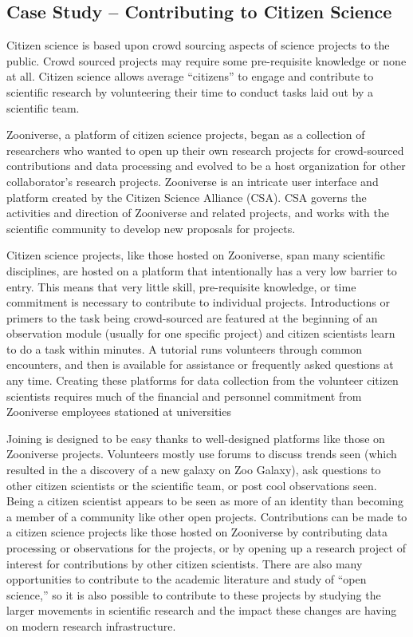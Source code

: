 \subsection{Case Study -- Contributing to Citizen Science}

Citizen science is based upon crowd sourcing aspects of science projects to the public. Crowd sourced projects may require some pre-requisite knowledge or none at all. Citizen science allows average “citizens” to engage and contribute to scientific research by volunteering their time to conduct tasks laid out by a scientific team. 
 
Zooniverse, a platform of citizen science projects, began as a collection of researchers who wanted to open up their own research projects for crowd-sourced contributions and data processing and evolved to be a host organization for other collaborator’s research projects. Zooniverse is an intricate user interface and platform created by the Citizen Science Alliance (CSA). CSA governs the activities and direction of Zooniverse and related projects, and works with the scientific community to develop new proposals for projects. 
 
Citizen science projects, like those hosted on Zooniverse, span many scientific disciplines, are hosted on a platform that intentionally has a very low barrier to entry. This means that very little skill, pre-requisite knowledge, or time commitment is necessary to contribute to individual projects. Introductions or primers to the task being crowd-sourced are featured at the beginning of an observation module (usually for one specific project) and citizen scientists learn to do a task within minutes. A tutorial runs volunteers through common encounters, and then is available for assistance or frequently asked questions at any time. Creating these platforms for data collection from the volunteer citizen scientists requires much of the financial and personnel commitment from Zooniverse employees stationed at universities
 
Joining is designed to be easy thanks to well-designed platforms like those on Zooniverse projects. Volunteers mostly use forums to discuss trends seen (which resulted in the a discovery of a new galaxy on Zoo Galaxy), ask questions to other citizen scientists or the scientific team, or post cool observations seen. Being a citizen scientist appears to be seen as more of an identity than becoming a member of a community like other open projects. Contributions can be made to a citizen science projects like those hosted on Zooniverse by contributing data processing or observations for the projects, or by opening up a research project of interest for contributions by other citizen scientists. There are also many opportunities to contribute to the academic literature and study of “open science,” so it is also possible to contribute to these projects by studying the larger movements in scientific research and the impact these changes are having on modern research infrastructure.
 
